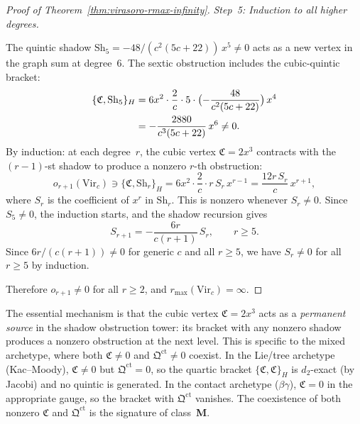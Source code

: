 \begin{proof}[Proof of Theorem~\textup{\ref{thm:virasoro-rmax-infinity}}]
\medskip
\emph{Step~5: Induction to all higher degrees.}

The quintic shadow
$\mathrm{Sh}_5 = -48/(c^2(5c+22))\,x^5 \neq 0$
acts as a new vertex in the graph sum at degree~$6$.
The sextic obstruction includes the cubic-quintic bracket:
\begin{align}
\{\mathfrak{C}, \mathrm{Sh}_5\}_H
&= 6x^2 \cdot \frac{2}{c} \cdot
 5\cdot\bigl(-\frac{48}{c^2(5c+22)}\bigr)\,x^4
 \notag \\
&= -\frac{2880}{c^3(5c+22)}\,x^6
\neq 0. \label{eq:sextic-leading-term}
\end{align}
By induction: at each degree~$r$, the cubic vertex
$\mathfrak{C} = 2x^3$ contracts with the $(r{-}1)$-st
shadow to produce a nonzero $r$-th obstruction:
\begin{equation}\label{eq:inductive-obstruction}
o_{r+1}(\mathrm{Vir}_c) \ni
\{\mathfrak{C}, \mathrm{Sh}_r\}_H
= 6x^2 \cdot \frac{2}{c} \cdot r\,S_r\,x^{r-1}
= \frac{12r\,S_r}{c}\,x^{r+1},
\end{equation}
where $S_r$ is the coefficient of $x^r$ in
$\mathrm{Sh}_r$. This is nonzero whenever $S_r \neq 0$.
Since $S_5 \neq 0$, the induction starts, and the
shadow recursion gives
\begin{equation}\label{eq:shadow-recursive-formula}
S_{r+1} = -\frac{6r}{c(r+1)}\,S_r,
\qquad r \geq 5.
\end{equation}
Since $6r/(c(r+1)) \neq 0$ for generic $c$ and all
$r \geq 5$, we have $S_r \neq 0$ for all $r \geq 5$
by induction.

Therefore $o_{r+1} \neq 0$ for all $r \geq 2$, and
$r_{\max}(\mathrm{Vir}_c) = \infty$.
\end{proof}

\begin{remark}
\label{rem:cubic-permanent-source}
The essential mechanism is that the cubic vertex
$\mathfrak{C} = 2x^3$ acts as a \emph{permanent source}
in the shadow obstruction tower: its bracket with any nonzero shadow
produces a nonzero obstruction at the next level. This
is specific to the mixed archetype, where both
$\mathfrak{C} \neq 0$ and $\mathfrak{Q}^{\mathrm{ct}}
\neq 0$ coexist. In the Lie/tree archetype (Kac--Moody),
$\mathfrak{C} \neq 0$ but $\mathfrak{Q}^{\mathrm{ct}} = 0$,
so the quartic bracket $\{\mathfrak{C}, \mathfrak{C}\}_H$
is $d_2$-exact (by Jacobi) and no quintic is generated.
In the contact archetype ($\beta\gamma$),
$\mathfrak{C} = 0$ in the appropriate gauge, so the
bracket with $\mathfrak{Q}^{\mathrm{ct}}$ vanishes.
The coexistence of both nonzero $\mathfrak{C}$ and
$\mathfrak{Q}^{\mathrm{ct}}$ is the signature of
class~\textbf{M}.
\end{remark}

